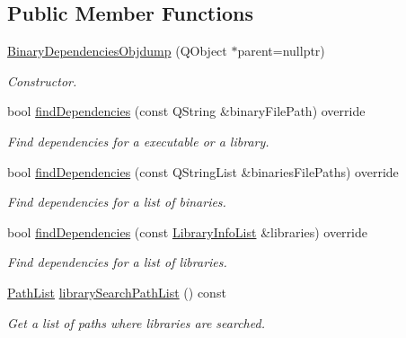 \subsection*{Public Member Functions}
\begin{DoxyCompactItemize}
\item 
\hyperlink{class_mdt_1_1_deploy_utils_1_1_binary_dependencies_objdump_a3bb8d6f31156903ae1b279b3dd6e87b8}{Binary\+Dependencies\+Objdump} (Q\+Object $\ast$parent=nullptr)
\begin{DoxyCompactList}\small\item\em Constructor. \end{DoxyCompactList}\item 
bool \hyperlink{class_mdt_1_1_deploy_utils_1_1_binary_dependencies_objdump_ad17be25ef296988d6255faa5c1dd573d}{find\+Dependencies} (const Q\+String \&binary\+File\+Path) override
\begin{DoxyCompactList}\small\item\em Find dependencies for a executable or a library. \end{DoxyCompactList}\item 
bool \hyperlink{class_mdt_1_1_deploy_utils_1_1_binary_dependencies_objdump_acaa13006ae7478fa5555f0d7356ae9d2}{find\+Dependencies} (const Q\+String\+List \&binaries\+File\+Paths) override
\begin{DoxyCompactList}\small\item\em Find dependencies for a list of binaries. \end{DoxyCompactList}\item 
bool \hyperlink{class_mdt_1_1_deploy_utils_1_1_binary_dependencies_objdump_ae26f2210f17cca66ba313751ae08e412}{find\+Dependencies} (const \hyperlink{class_mdt_1_1_deploy_utils_1_1_library_info_list}{Library\+Info\+List} \&libraries) override
\begin{DoxyCompactList}\small\item\em Find dependencies for a list of libraries. \end{DoxyCompactList}\item 
\hyperlink{class_mdt_1_1_deploy_utils_1_1_path_list}{Path\+List} \hyperlink{class_mdt_1_1_deploy_utils_1_1_binary_dependencies_objdump_af0ed8d25c32ae6fa1540ce43c63b1af6}{library\+Search\+Path\+List} () const 
\begin{DoxyCompactList}\small\item\em Get a list of paths where libraries are searched. \end{DoxyCompactList}\end{DoxyCompactItemize}


